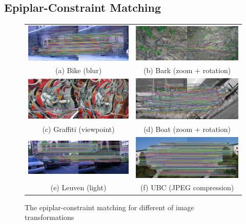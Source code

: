 \subsection {Epiplar-Constraint Matching}
\begin{figure}[H]
\begin{tabular}{cc}
  \includegraphics[width=75mm]{figures/bike_final_1_3} &  \includegraphics[width=75mm]{figures/barks_final_1_3} \\
(a) Bike (blur) & (b) Bark (zoom + rotation) \\[6pt]
 \includegraphics[width=75mm]{figures/graffiti_final_1_3} &  \includegraphics[width=75mm]{figures/boat_final_1_3} \\
(c) Graffiti (viewpoint) & (d) Boat (zoom + rotation) \\[6pt]
 \includegraphics[width=75mm]{figures/leuven_final_1_3} &  \includegraphics[width=75mm]{figures/ubc_final_1_3} \\
(e) Leuven (light) & (f) UBC (JPEG compression) \\[6pt]
\end{tabular}
\caption{The epiplar-constraint matching for different of image transformations}\label{fig:epipolar_matching}
\end{figure}

